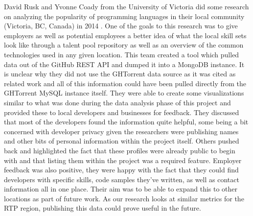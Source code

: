 David Rusk and Yvonne Coady from the University of Victoria did some research on analyzing the popularity of programming languages in their local community (Victoria, BC, Canada) in 2014 \cite{rusk_location-based_2014}. One of the goals to this research was to give employers as well as potential employees a better idea of what the local skill sets look like through a talent pool repository as well as an overview of the common technologies used in any given location. This team created a tool which pulled data out of the GitHub REST API and dumped it into a MongoDB instance. It is unclear why they did not use the GHTorrent data source as it was cited as related work and all of this information could have been pulled directly from the GHTorrent MySQL instance itself. They were able to create some visualizations similar to what was done during the data analysis phase of this project and provided these to local developers and businesses for feedback. They discussed that most of the developers found the information quite helpful, some being a bit concerned with developer privacy given the researchers were publishing names and other bits of personal information within the project itself. Others pushed back and highlighted the fact that these profiles were already public to begin with and that listing them within the project was a required feature. Employer feedback was also positive, they were happy with the fact that they could find developers with specific skills, code samples they've written, as well as contact information all in one place. Their aim was to be able to expand this to other locations as part of future work. As our research looks at similar metrics for the RTP region, publishing this data could prove useful in the future. 

